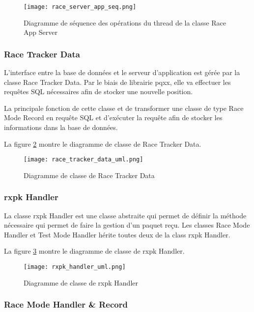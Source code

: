 \begin{figure}[htb]
\centering 
\texttt{[image: race\_server\_app\_seq.png]} 
\caption{Diagramme de séquence des opérations du thread de la classe Race App Server}
\label{fig:race_app_server_seq}
\end{figure}

\subsubsection{Race Tracker Data}

L'interface entre la base de données et le serveur d'application est gérée par la classe Race Tracker Data. Par le biais de librairie pqxx, elle va effectuer les requêtes SQL nécessaires afin de stocker une nouvelle position.

La principale fonction de cette classe et de transformer une classe de type Race Mode Record en requête SQL et d'exécuter la requête afin de stocker les informations dans la base de données.

La figure \ref{fig:race_tracker_data_uml} montre le diagramme de classe de Race Tracker Data.

\begin{figure}[htb]
\centering 
\texttt{[image: race\_tracker\_data\_uml.png]} 
\caption{Diagramme de classe de Race Tracker Data}
\label{fig:race_tracker_data_uml}
\end{figure}

\subsubsection{rxpk Handler}

La classe rxpk Handler est une classe abstraite qui permet de définir la méthode nécessaire qui permet de faire la gestion d'un paquet reçu. Les classes Race Mode Handler et Test Mode Handler hérite toutes deux de la class rxpk Handler.

La figure \ref{fig:rxpk_handler_uml} montre le diagramme de classe de rxpk Handler.

\begin{figure}[htb]
\centering 
\texttt{[image: rxpk\_handler\_uml.png]} 
\caption{Diagramme de classe de rxpk Handler}
\label{fig:rxpk_handler_uml}
\end{figure}

\subsubsection{Race Mode Handler \& Record}

